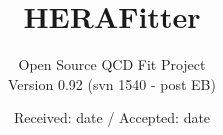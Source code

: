 \usepackage{tikz}
\usetikzlibrary{arrows,shapes,positioning}

\usepackage{multirow}




\usepackage{xspace}
\providecommand{\fitter}{{\texttt{HERAFitter}}\xspace}
\providecommand{\fastnlo}{{\texttt{fastNLO}}\xspace}
\providecommand{\applgrid}{{\texttt{APPLGRID}}\xspace}
\providecommand{\qcdnum}{{\texttt{QCDNUM}}\xspace}
\providecommand{\minuit}{{\texttt{MINUIT}}\xspace}
\providecommand{\mcfm}{{\texttt{MCFM}}\xspace}
\providecommand{\nlojetpp}{{\texttt{NLOJet++}}\xspace}
\providecommand{\lhapdf}{{\texttt{LHAPDF}}\xspace}
\providecommand{\crundec}{{\texttt{CRunDec}}\xspace}
\providecommand{\hoppet}{{\texttt{HOPPET}}\xspace}
\providecommand{\GeV}{\ensuremath{\,\text{Ge\hspace{-.08em}V}}\xspace}
\providecommand{\pperp}{\ensuremath{p_{\perp}}\xspace}
\providecommand{\mur}{\ensuremath{\mu_\mathrm{R}}\xspace}
\providecommand{\muf}{\ensuremath{\mu_\mathrm{F}}\xspace}
\providecommand{\as}{\ensuremath{\alpha_\mathrm{s}}\xspace}
\providecommand{\asmz}{\ensuremath{\alpha_\mathrm{s}(M_Z)}\xspace}
\providecommand{\asq}{\ensuremath{\alpha_\mathrm{s}(Q)}\xspace}
\providecommand{\tmdlib}{{\texttt{TMDlib}}\xspace}


%
%


\title{HERAFitter %
}
\subtitle{Open Source QCD Fit Project \\
    { \small {Version 0.92 (svn 1540 - post EB)}}
}



%
%



\date{Received: date / Accepted: date}


